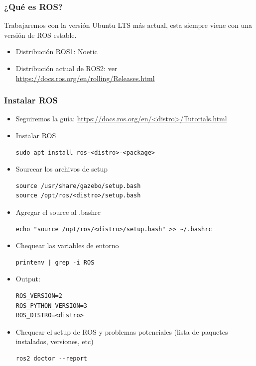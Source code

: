 \begin{frame}
	\frametitle{¿Qué es ROS?}
    Trabajaremos con la versión Ubuntu LTS más actual, esta siempre viene con una versión de ROS estable.
	
    \begin{itemize}
    \item Distribución ROS1: Noetic
    \item Distribución actual de ROS2: ver \href{https://docs.ros.org/en/rolling/Releases.html}{https://docs.ros.org/en/rolling/Releases.html}
    \end{itemize}
\end{frame}

\begin{frame}[fragile]
	\frametitle{Instalar ROS}
    \scriptsize
    \begin{itemize}
        \item Seguiremos la guía: \href{https://docs.ros.org/en/<distro>/Tutorials.html}{https://docs.ros.org/en/<distro>/Tutorials.html}
        \item Instalar ROS
        \begin{lstlisting}[style=bash]
sudo apt install ros-<distro>-<package>
        \end{lstlisting}

        \item Sourcear los archivos de setup
        \begin{lstlisting}[style=bash]source /usr/share/gazebo/setup.bash
source /opt/ros/<distro>/setup.bash
        \end{lstlisting}

        \item Agregar el source al .bashrc
        \begin{lstlisting}[style=bash]
echo "source /opt/ros/<distro>/setup.bash" >> ~/.bashrc
        \end{lstlisting}

        \item Chequear las variables de entorno
        \begin{lstlisting}[style=bash]
printenv | grep -i ROS
        \end{lstlisting}

        \item Output:
        \begin{lstlisting}[style=bash]
ROS_VERSION=2
ROS_PYTHON_VERSION=3
ROS_DISTRO=<distro>
        \end{lstlisting}	
        
        \item Chequear el setup de ROS y problemas potenciales (lista de paquetes instalados, versiones, etc)
        
        \begin{lstlisting}[style=bash]
ros2 doctor --report
        \end{lstlisting}
    \end{itemize}
\end{frame}

